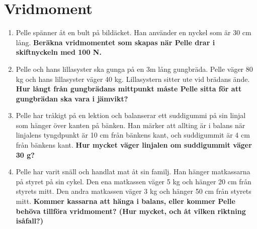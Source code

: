 \documentclass[11pt]{article}
\begin{document}
\raggedright
\setcounter{section}{2}
\section{Vridmoment}

\begin{enumerate}[itemsep=2em]
        \item
              \begin{minipage}[t]{0.5\textwidth}
                      Pelle spänner åt en bult på bildäcket. Han använder en nyckel som är 30 cm lång. \textbf{Beräkna vridmomentet som skapas när Pelle drar i skiftnyckeln med 100 N.}
              \end{minipage}
              \hfill
              \begin{adjustbox}{valign=t}
                      
              \end{adjustbox}
        \item
              Pelle och hans lillasyster ska gunga på en 3m lång gungbräda. Pelle väger 80 kg och hans lillasyster väger 40 kg. Lillasystern sitter ute vid brädans ände. \textbf{Hur långt från gungbrädans mittpunkt måste Pelle sitta för att gungbrädan ska vara i jämvikt?}
              \begin{center}
                      
              \end{center}

        \item
              Pelle har tråkigt på en lektion och balanserar ett suddigummi på sin linjal som hänger över kanten på bänken. Han märker att allting är i balans när linjalens tyngdpunkt är 10 cm från bänkens kant, och suddigummit är 4 cm från bänkens kant. \textbf{Hur mycket väger linjalen om suddigummit väger 30 g?}
              \begin{center}
                      
              \end{center}

        \item
              \begin{minipage}[t]{0.5\textwidth}
                      Pelle har varit snäll och handlat mat åt sin familj. Han hänger matkassarna på styret på sin cykel. Den ena matkassen väger 5 kg och hänger 20 cm från styrets mitt. Den andra matkassen väger 3 kg och hänger 50 cm från styrets mitt. \textbf{Kommer kassarna att hänga i balans, eller kommer Pelle behöva tillföra vridmoment? (Hur mycket, och åt vilken riktning isåfall?)}
              \end{minipage}
              \hfill
              \begin{adjustbox}{valign=t}
                      
              \end{adjustbox}


\end{enumerate}
\end{document}
